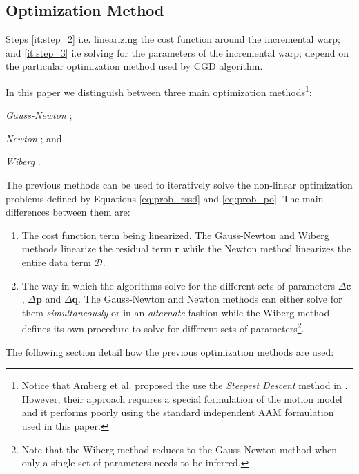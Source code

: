 \subsection{Optimization Method}
\label{sec:optimization}
Steps \ref{it:step_2} i.e. linearizing the cost function around the incremental warp; and \ref{it:step_3} i.e solving for the parameters of the incremental warp; depend on the particular optimization method used by CGD algorithm.

In this paper we distinguish between three main optimization methods\footnote{Notice that Amberg et al. proposed the use the \emph{Steepest Descent} method \cite{Boyd2004} in \cite{Amberg2009}. However, their approach requires a special formulation of the motion model and it performs poorly using the standard independent AAM formulation \cite{Matthews2004} used in this paper.}:
\begin{inparaenum}
    \item \emph{Gauss-Newton} \cite{Boyd2004, Matthews2004, Gross2005, Martins2010};
    \item \emph{Newton} \cite{Boyd2004, Kossaifi2014}; and
    \item \emph{Wiberg} \cite{Okatani2006, Strelow2012, Papandreou2008, Tzimiropoulos2013}.
\end{inparaenum}
The previous methods can be used to iteratively solve the non-linear optimization problems defined by Equations \ref{eq:prob_rssd} and \ref{eq:prob_po}. The main differences between them are: 
\begin{enumerate}
    \item The cost function term being linearized. The Gauss-Newton and Wiberg methods linearize the residual term $\mathbf{r}$ while the Newton method linearizes the entire data term $\mathcal{D}$.
    
    \item The way in which the algorithms solve for the different sets of parameters $\Delta \mathbf{c}$, $\Delta \mathbf{p}$ and $\Delta \mathbf{q}$. The Gauss-Newton and Newton methods can either solve for them \emph{simultaneously} or in an \emph{alternate} fashion while the Wiberg method defines its own procedure to solve for different sets of parameters\footnote{Note that the Wiberg method reduces to the Gauss-Newton method when only a single set of parameters needs to be inferred.}.
\end{enumerate}

The following section detail how the previous optimization methods are used:


